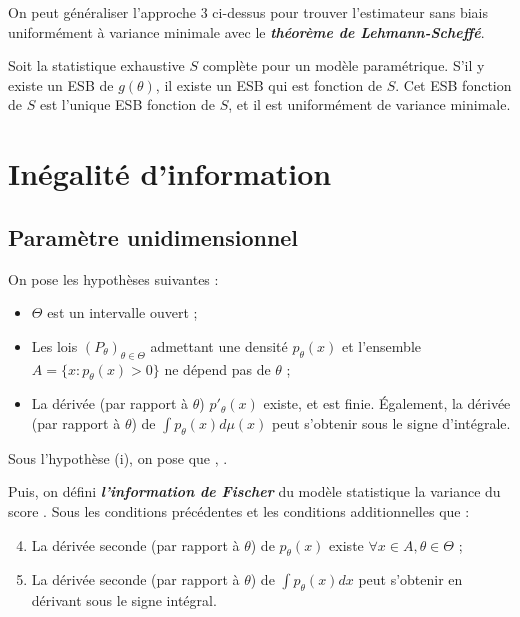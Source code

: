 \documentclass[10pt, french]{report}
\begin{document}
\begin{multicols*}{2}
On peut généraliser l'approche 3 ci-dessus pour trouver l'estimateur sans biais uniformément à variance minimale avec le \textbf{\textit{théorème de Lehmann-Scheffé}}.

\begin{definitionNOHFILL}
Soit la statistique exhaustive $S$ complète pour un modèle paramétrique. S'il y existe un ESB de $g(\theta)$, il existe un ESB qui est fonction de $S$. Cet ESB fonction de $S$ est l'unique ESB fonction de $S$, et il est uniformément de variance minimale.
\end{definitionNOHFILL}



\newpage
\chapter{Inégalité d'information}
\section{Paramètre unidimensionnel}
\begin{definitionNOHFILL}
On pose les hypothèses suivantes : 
\begin{itemize}[label = (\Roman*)]
	\item	$\Theta$ est un intervalle ouvert ;
	\item	Les lois $(P_{\theta})_{\theta \in \Theta}$ admettant une densité $p_{\theta}(x)$ et l'ensemble $A = \{x : p_{\theta}(x) > 0\}$ ne dépend pas de $\theta$ ;
	\item	La dérivée (par rapport à $\theta$) $p'_{\theta}(x)$ existe, et est finie. Également, la dérivée (par rapport à $\theta$) de $\int p_{\theta}(x) d\mu(x)$ peut s'obtenir sous le signe d'intégrale.
\end{itemize}

Sous l'hypothèse (i), on pose que , \lfbox[conditions]{$\forall \theta \in \Theta$}. 

\bigskip

Puis, on défini \textbf{\textit{l'information de Fischer}} du modèle statistique la variance du score . Sous les conditions précédentes et les conditions additionnelles que :
\begin{enumerate}[label = (\Roman*)]
	\setcounter{enumi}{3}
	\item	La dérivée seconde (par rapport à $\theta$) de $p_{\theta}(x)$ existe $\forall x \in A, \theta \in \Theta$ ;
	\item	La dérivée seconde (par rapport à $\theta$) de $\int p_{\theta}(x) dx$ peut s'obtenir en dérivant sous le signe intégral.
\end{enumerate}


\end{definitionNOHFILL}
\end{multicols*}
\end{document}
